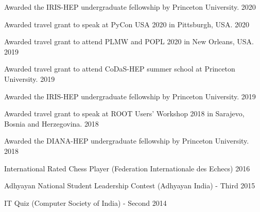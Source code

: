 \documentclass[10pt, letterpaper]{fulldeps}
\begin{document}
%
%

%
%
\begin{tightitemize}
\item Awarded the IRIS-HEP undergraduate fellowship by Princeton University. \hfill{2020}
    \item Awarded travel grant to speak at PyCon USA 2020 in Pittsburgh, USA. \hfill{2020}
    \item Awarded travel grant to attend PLMW and POPL 2020 in New Orleans, USA. \hfill{2019}
    \item Awarded travel grant to attend CoDaS-HEP summer school at Princeton University. \hfill{2019}
    \item Awarded the IRIS-HEP undergraduate fellowship by Princeton University. \hfill{2019}
    \item Awarded travel grant to speak at ROOT Users' Workshop 2018 in Sarajevo, Bosnia and Herzegovina. \hfill{2018}
	\item Awarded the DIANA-HEP undergraduate fellowship by Princeton University. \hfill{2018}
\end{tightitemize}

\begin{tightitemize}
    \item International Rated Chess Player (Federation Internationale des Echecs) \hfill{2016}
    \item Adhyayan National Student Leadership Contest (Adhyayan India) - Third \hfill{2015}
    \item IT Quiz (Computer Society of India) - Second \hfill{2014}
\end{tightitemize}
\end{document}
